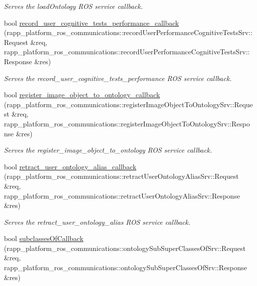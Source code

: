 \begin{DoxyCompactItemize}
\begin{DoxyCompactList}\small\item\em Serves the load\-Ontology R\-O\-S service callback. \end{DoxyCompactList}\item 
bool \hyperlink{classKnowrobWrapperCommunications_a4c2e5ed4bf27e9ae7d722b50d8f607e3}{record\-\_\-user\-\_\-cognitive\-\_\-tests\-\_\-performance\-\_\-callback} (rapp\-\_\-platform\-\_\-ros\-\_\-communications\-::record\-User\-Performance\-Cognitive\-Tests\-Srv\-::\-Request \&req, rapp\-\_\-platform\-\_\-ros\-\_\-communications\-::record\-User\-Performance\-Cognitive\-Tests\-Srv\-::\-Response \&res)
\begin{DoxyCompactList}\small\item\em Serves the record\-\_\-user\-\_\-cognitive\-\_\-tests\-\_\-performance R\-O\-S service callback. \end{DoxyCompactList}\item 
bool \hyperlink{classKnowrobWrapperCommunications_a9d73180cd20c89bbc9e71469a0c53388}{register\-\_\-image\-\_\-object\-\_\-to\-\_\-ontology\-\_\-callback} (rapp\-\_\-platform\-\_\-ros\-\_\-communications\-::register\-Image\-Object\-To\-Ontology\-Srv\-::\-Request \&req, rapp\-\_\-platform\-\_\-ros\-\_\-communications\-::register\-Image\-Object\-To\-Ontology\-Srv\-::\-Response \&res)
\begin{DoxyCompactList}\small\item\em Serves the register\-\_\-image\-\_\-object\-\_\-to\-\_\-ontology R\-O\-S service callback. \end{DoxyCompactList}\item 
bool \hyperlink{classKnowrobWrapperCommunications_aa149f2929cb7b5cda2c7615e07d4a5cc}{retract\-\_\-user\-\_\-ontology\-\_\-alias\-\_\-callback} (rapp\-\_\-platform\-\_\-ros\-\_\-communications\-::retract\-User\-Ontology\-Alias\-Srv\-::\-Request \&req, rapp\-\_\-platform\-\_\-ros\-\_\-communications\-::retract\-User\-Ontology\-Alias\-Srv\-::\-Response \&res)
\begin{DoxyCompactList}\small\item\em Serves the retract\-\_\-user\-\_\-ontology\-\_\-alias R\-O\-S service callback. \end{DoxyCompactList}\item 
bool \hyperlink{classKnowrobWrapperCommunications_a4d0118b6016bd1df21abca155ae9b423}{subclasses\-Of\-Callback} (rapp\-\_\-platform\-\_\-ros\-\_\-communications\-::ontology\-Sub\-Super\-Classes\-Of\-Srv\-::\-Request \&req, rapp\-\_\-platform\-\_\-ros\-\_\-communications\-::ontology\-Sub\-Super\-Classes\-Of\-Srv\-::\-Response \&res)

\end{DoxyCompactItemize}
